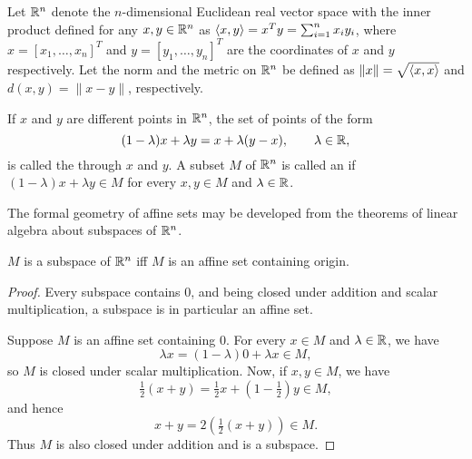\documentclass[11pt,a4paper]{article}
\begin{document}
Let $\mathbb{R}^n$ denote the $n$-dimensional Euclidean real vector space with the inner product defined for any $x,y\in \mathbb{R}^n$ as $\langle x, y \rangle = x^Ty = \sum_{i=1}^n x_i y_i$, where $x = [x_1,\ldots, x_n]^T$ and $y = [y_1,\ldots, y_n]^T$ are the coordinates of $x$ and $y$ respectively. Let the norm and the metric on $\mathbb{R}^n$ be defined as $\|x\| = \sqrt{\langle x, x \rangle}$ and $d(x,y) = \|x-y\|$, respectively.

\begin{definition}
    If $x$ and $y$ are different points in $\mathbb{R}^n$, the set of points of the form 
    \begin{equation*}
        (1-\lambda) x + \lambda y = x + \lambda (y-x), \qquad \lambda \in \mathbb{R},
    \end{equation*}
    is called the  through $x$ and $y$. A subset $M$ of $\mathbb{R}^n$ is called an  if $(1 - \lambda) x + \lambda y \in M$ for every $x,y\in M$ and $\lambda \in \mathbb{R}$.
\end{definition}

The formal geometry of affine sets may be developed from the theorems of linear algebra about subspaces of $\mathbb{R}^n$.

\begin{theorem}\label{thm:subspace_affine}
    $M$ is a subspace of $\mathbb{R}^n$ iff $M$ is an affine set containing origin.
\end{theorem}

\begin{proof}
    \forward Every subspace contains $0$, and being closed under addition and scalar multiplication, a subspace is in particular an affine set.

    \noindent\converse Suppose $M$ is an affine set containing $0$. For every $x\in M$ and $\lambda\in \mathbb{R}$, we have
    \begin{equation*}
        \lambda x = (1-\lambda) 0 + \lambda x \in M,
    \end{equation*} 
    so $M$ is closed under scalar multiplication. Now, if $x, y\in M$, we have
    \begin{equation*}
        \tfrac{1}{2}(x+y) = \tfrac{1}{2} x + (1-\tfrac{1}{2}) y \in M,
    \end{equation*}
    and hence 
    \begin{equation*}
        x+y = 2(\tfrac{1}{2}(x+y)) \in M.
    \end{equation*}
    Thus $M$ is also closed under addition and is a subspace.
\end{proof}
\end{document}
